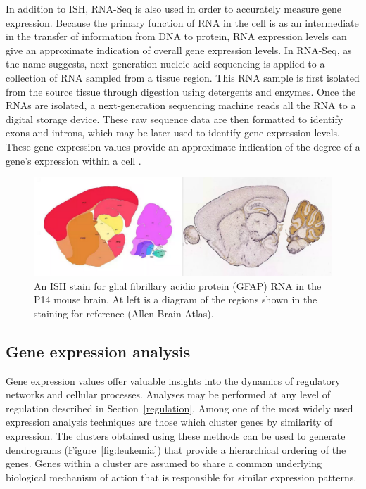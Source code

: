 \documentclass[12pt,oneside,onecolumn,a4paper]{article}
\begin{document}
In addition to ISH, RNA-Seq is also used in order to accurately measure gene expression. Because the primary function of RNA in the cell is as an intermediate in the transfer of information from DNA to protein, RNA expression levels can give an approximate indication of overall gene expression levels. In RNA-Seq, as the name suggests, next-generation nucleic acid sequencing is applied to a collection of RNA sampled from a tissue region. This RNA sample is first isolated from the source tissue through digestion using detergents and enzymes. Once the RNAs are isolated, a next-generation sequencing machine reads all the RNA to a digital storage device. These raw sequence data are then formatted to identify exons and introns, which may be later used to identify gene expression levels. These gene expression values provide an approximate indication of the degree of a gene's expression within a cell \citep{Wang_2009}.

\begin{figure}[h!]
\begin{center}
\includegraphics[width=0.8\columnwidth]{figures/ISH/ISH}
\caption{An ISH stain for glial fibrillary acidic protein (GFAP) RNA in the P14 mouse brain. At left is a diagram of the regions shown in the staining for reference (Allen Brain Atlas).\label{fig:ish}
}
\end{center}
\end{figure}

\subsection{Gene expression analysis}\label{gene_analysis}

Gene expression values offer valuable insights into the dynamics of regulatory networks and cellular processes. Analyses may be performed at any level of regulation described in Section~\ref{regulation}. Among one of the most widely used expression analysis techniques are those which cluster genes by similarity of expression. The clusters obtained using these methods can be used to generate dendrograms (Figure~\ref{fig:leukemia}) that provide a hierarchical ordering of the genes. Genes within a cluster are assumed to share a common underlying biological mechanism of action that is responsible for similar expression patterns.
\end{document}
